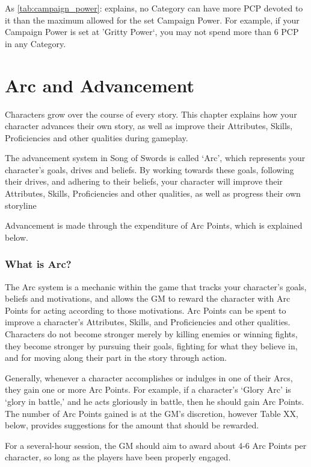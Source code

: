 \documentclass[oneside,11pt,english]{book}
\begin{document}
 
As \autoref{tab:campaign_power}:  explains, no Category can have more PCP devoted to it than the maximum allowed for the 
set Campaign Power. For example, if your Campaign Power is set at 'Gritty Power`, you may not spend 
more than 6 PCP in any Category. 
\chapter{Arc and Advancement}\label{ch:arc}
\startcontents[chapters]
\clearpage
Characters grow over the course of every story. This chapter explains how your character advances their 
own story, as well as improve their Attributes, Skills, Proficiencies and other qualities during gameplay. 
 

The advancement system in Song of Swords is called ‘Arc’, which represents your character’s goals, 
drives and beliefs. By working towards these goals, following their drives, and adhering to their beliefs, 
your character will improve their Attributes, Skills, Proficiencies and other qualities, as well as progress 
their own storyline 

 
Advancement is made through the expenditure of Arc Points, which is explained below. 

 
\subsection*{What is Arc?}
The Arc system is a mechanic within the game that tracks your character’s goals, beliefs and motivations, 
and allows the GM to reward the character with Arc Points for acting according to those motivations. Arc 
Points can be spent to improve a character’s Attributes, Skills, and Proficiencies and other qualities. 
Characters do not become stronger merely by killing enemies or winning fights, they become stronger by 
pursuing their goals, fighting for what they believe in, and for moving along their part in the story through 
action. 

 
Generally, whenever a character accomplishes or indulges in one of their Arcs, they gain one or more Arc 
Points. For example, if a character’s ‘Glory Arc’ is ‘glory in battle,’ and he acts gloriously in battle, then 
he should gain Arc Points. The number of Arc Points gained is at the GM’s discretion, however Table 
XX, below, provides suggestions for the amount that should be rewarded. 

 
For a several-hour session, the GM should aim to award about 4-6 Arc Points per character, so long as the 
players have been properly engaged. 
 
\end{document}
